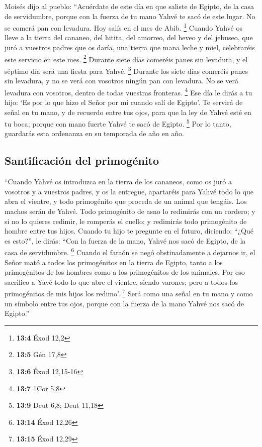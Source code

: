  Moisés dijo al pueblo: ``Acuérdate de este día en que
saliste de Egipto, de la casa de servidumbre, porque con la fuerza de tu
mano Yahvé te sacó de este lugar. No se comerá pan con levadura.
 Hoy salís en el mes de Abib. \footnote{\textbf{13:4} Éxod
  12,2}  Cuando Yahvé os lleve a la tierra del cananeo,
del hitita, del amorreo, del heveo y del jebuseo, que juró a vuestros
padres que os daría, una tierra que mana leche y miel, celebraréis este
servicio en este mes. \footnote{\textbf{13:5} Gén 17,8} 
Durante siete días comeréis panes sin levadura, y el séptimo día será
una fiesta para Yahvé. \footnote{\textbf{13:6} Éxod 12,15-16}
 Durante los siete días comeréis panes sin levadura, y no
se verá con vosotros ningún pan con levadura. No se verá levadura con
vosotros, dentro de todas vuestras fronteras. \footnote{\textbf{13:7}
  1Cor 5,8}  Ese día le dirás a tu hijo: `Es por lo que
hizo el Señor por mí cuando salí de Egipto'.  Te servirá
de señal en tu mano, y de recuerdo entre tus ojos, para que la ley de
Yahvé esté en tu boca; porque con mano fuerte Yahvé te sacó de Egipto.
\footnote{\textbf{13:9} Deut 6,8; Deut 11,18}  Por lo
tanto, guardarás esta ordenanza en su temporada de año en año.

\hypertarget{santificaciuxf3n-del-primoguxe9nito}{%
\subsection{Santificación del
primogénito}\label{santificaciuxf3n-del-primoguxe9nito}}

 ``Cuando Yahvé os introduzca en la tierra de los
cananeos, como os juró a vosotros y a vuestros padres, y os la entregue,
 apartaréis para Yahvé todo lo que abra el vientre, y
todo primogénito que proceda de un animal que tengáis. Los machos serán
de Yahvé.  Todo primogénito de asno lo redimirás con un
cordero; y si no lo quieres redimir, le romperás el cuello; y redimirás
todo primogénito de hombre entre tus hijos.  Cuando tu
hijo te pregunte en el futuro, diciendo: ``¿Qué es esto?'', le dirás:
``Con la fuerza de la mano, Yahvé nos sacó de Egipto, de la casa de
servidumbre. \footnote{\textbf{13:14} Éxod 12,26}  Cuando
el faraón se negó obstinadamente a dejarnos ir, el Señor mató a todos
los primogénitos en la tierra de Egipto, tanto a los primogénitos de los
hombres como a los primogénitos de los animales. Por eso sacrifico a
Yavé todo lo que abre el vientre, siendo varones; pero a todos los
primogénitos de mis hijos los redimo'. \footnote{\textbf{13:15} Éxod
  12,29}  Será como una señal en tu mano y como un
símbolo entre tus ojos, porque con la fuerza de la mano Yahvé nos sacó
de Egipto.''


